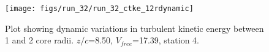\begin{figure}[H]
\centering
\texttt{[image: figs/run\_32/run\_32\_ctke\_12rdynamic]}
\caption{Plot showing dynamic variations in turbulent kinetic energy between 1 and 2 core radii. $z/c$=8.50, $V_{free}$=17.39, station 4.}
\label{fig:run_32_ctke_12rdynamic}
\end{figure}


